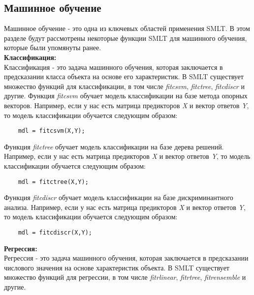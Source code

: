 \documentclass[a4paper, 12pt]{article}%
\begin{document}
\begin{titlepage}
	\section{Машинное обучение}
	
	\hspace{\parindent} Машинное обучение - это одна из ключевых областей применения SMLT. В этом разделе будут рассмотрены некоторые функции SMLT для машинного обучения, которые были упомянуты ранее.\\
	
	\textbf{Классификация: }\\
	Классификация - это задача машинного обучения, которая заключается в предсказании класса объекта на основе его характеристик. В SMLT существует множество функций для классификации, в том числе \textit{fitcsvm}, \textit{fitctree}, \textit{fitcdiscr} и другие.
	Функция \textit{fitcsvm} обучает модель классификации на базе метода опорных векторов. Например, если у нас есть матрица предикторов \textit{X} и вектор ответов \textit{Y}, то модель классификации обучается следующим образом:\\
	
	
	\begin{lstlisting}
	mdl = fitcsvm(X,Y);
	\end{lstlisting}	
	
	
	Функция \textit{fitctree} обучает модель классификации на базе дерева решений. Например, если у нас есть матрица предикторов \textit{X} и вектор ответов \textit{Y}, то модель классификации обучается следующим образом:\\
	
	\begin{lstlisting}
	mdl = fitctree(X,Y);
	\end{lstlisting}
	
	Функция \textit{fitcdiscr} обучает модель классификации на базе дискриминантного анализа. Например, если у нас есть матрица предикторов \textit{X} и вектор ответов \textit{Y}, то модель классификации обучается следующим образом:\\
	
	
	\begin{lstlisting}
	mdl = fitcdiscr(X,Y);
	\end{lstlisting}
	
	
	\textbf{Регрессия:}\\
	Регрессия - это задача машинного обучения, которая заключается в предсказании числового значения на основе характеристик объекта. В SMLT существует множество функций для регрессии, в том числе \textit{fitrlinear}, \textit{fitrtree}, \textit{fitrensemble} и другие.
	

\end{titlepage}
\end{document}

